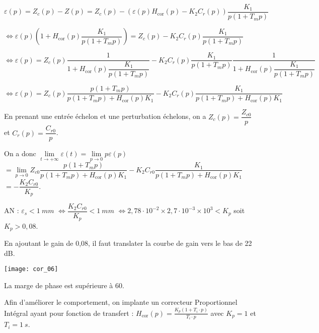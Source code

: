 $
\varepsilon(p)=Z_c(p)-Z(p) = Z_c(p)- \left(\varepsilon(p) H_{\text{cor}}(p)-   K_2 C_r(p)\right) \dfrac{K_1}{p\left(1+T_m p\right)}$

$\Leftrightarrow \varepsilon(p)\left(1 +  H_{\text{cor}}(p)\dfrac{K_1}{p\left(1+T_m p\right)} \right) = Z_c(p) - K_2 C_r(p) \dfrac{K_1}{p\left(1+T_m p\right)}$

$\Leftrightarrow \varepsilon(p)  = 
Z_c(p)\dfrac{1}{1 +  H_{\text{cor}}(p)\dfrac{K_1}{p\left(1+T_m p\right)}} 
-   K_2 C_r(p) \dfrac{K_1}{p\left(1+T_m p\right)} \dfrac{1}{1 +  H_{\text{cor}}(p)\dfrac{K_1}{p\left(1+T_m p\right)}}$

$\Leftrightarrow \varepsilon(p)  = 
Z_c(p)\dfrac{{p\left(1+T_m p\right)}}{{p\left(1+T_m p\right)} +  H_{\text{cor}}(p){K_1}} 
-   K_2 C_r(p)  \dfrac{K_1}{p\left(1+T_m p\right) +  H_{\text{cor}}(p){K_1}}$


En prenant une entrée échelon et une perturbation échelons, on a $Z_c(p) = \dfrac{Z_{c0}}{p}$ et 
$C_{r}(p) = \dfrac{C_{r0}}{p}$.

On a donc $\lim\limits_{t\to +\infty} \varepsilon(t)=\lim\limits_{p\to 0} p\varepsilon(p)$
$=  \lim\limits_{p\to 0} Z_{c0}\dfrac{{p\left(1+T_m p\right)}}{{p\left(1+T_m p\right)} +  H_{\text{cor}}(p){K_1}} 
-   K_2 C_{r0}  \dfrac{K_1}{p\left(1+T_m p\right) +  H_{\text{cor}}(p){K_1}} $ $ =   -\dfrac{K_2 C_{r0}}{ K_p}$.

AN : $\varepsilon_s < \SI{1}{mm}$
$\Leftrightarrow \dfrac{K_2 C_{r0}}{ K_p} < \SI{1}{mm}$  
$\Leftrightarrow 
2,78 \cdot 10^{-2} \times 2,7 \cdot 10^{-3} \times 10^3<  K_p$  soit $K_p >0,08$.
\else
\fi


\ifprof
En ajoutant le gain de 0,08, il faut translater la courbe de gain vers le bas de 22 dB.

\begin{center}
\texttt{[image: cor\_06]}
\end{center}

La marge de phase est supérieure à 60\degres.
\else
\fi

Afin d'améliorer le comportement, on implante un correcteur Proportionnel Intégral ayant pour fonction de transfert : $H_{\text{cor}}(p)=\frac{K_p\left(1+T_i\cdot p\right)}{T_i\cdot p}$ avec $K_p=1$ et $T_i = \SI{1}{s}$.

